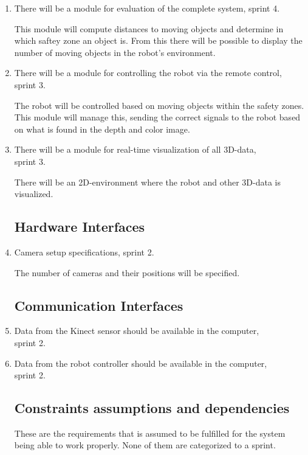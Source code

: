 \documentclass[10pt,a4paper]{article}
\begin{document}
\begin{enumerate}
\item There will be a module for evaluation of the complete system, sprint 4.

{\addtolength{\leftskip}{5mm}This module will compute distances to moving objects and determine in which saftey zone an object is. From this there will be possible to display the number of moving objects in the robot's environment. 
\par}

\item There will be a module for controlling the robot via the remote control, sprint 3.

{\addtolength{\leftskip}{5mm}The robot will be controlled based on moving objects within the safety zones. This module will manage this, sending the correct signals to the robot based on what is found in the depth and color image.
\par}

\item There will be a module for real-time visualization of all 3D-data,\\ sprint 3.

{\addtolength{\leftskip}{5mm}There will be an 2D-environment where the robot and other 3D-data is visualized.\par}

\subsection{Hardware Interfaces}

\item Camera setup specifications, sprint 2.

{\addtolength{\leftskip}{5mm} The number of cameras and their positions will be specified.\par}

\subsection{Communication Interfaces}

\item Data from the Kinect sensor should be available in the computer, \\sprint 2.
\item Data from the robot controller should be available in the computer, \\sprint 2.

\subsection{Constraints assumptions and dependencies}
These are the requirements that is assumed to be fulfilled for the system being able to work properly. None of them are categorized to a sprint.


\end{enumerate}
\end{document}
